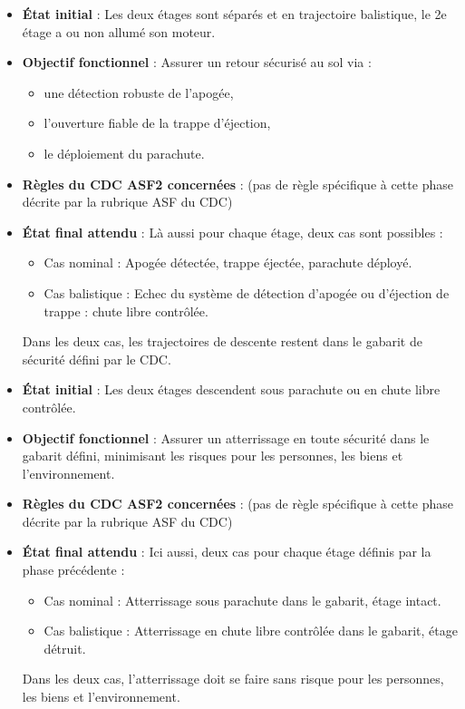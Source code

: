 \begin{itemize}
    \item \textbf{État initial} : Les deux étages sont séparés et en trajectoire balistique, le 2e étage a ou non allumé son moteur.
    \item \textbf{Objectif fonctionnel} : Assurer un retour sécurisé au sol via :
    \begin{itemize}
        \item une détection robuste de l’apogée,
        \item l’ouverture fiable de la trappe d’éjection,
        \item le déploiement du parachute.
    \end{itemize}
    \item \textbf{Règles du \acrshort{CDC} ASF2 concernées} : (pas de règle spécifique à cette phase décrite par la rubrique ASF
    du \acrshort{CDC})
    \item \textbf{État final attendu} : Là aussi pour chaque étage, deux cas sont possibles :
    \begin{itemize}
        \item Cas nominal : Apogée détectée, trappe éjectée, parachute déployé.
        \item Cas balistique : Echec du système de détection d’apogée ou d’éjection de trappe : chute libre contrôlée.
    \end{itemize}
    Dans les deux cas, les trajectoires de descente restent dans le gabarit de sécurité défini par le \acrshort{CDC}.
\end{itemize}

\vfill

\begin{itemize}
    \item \textbf{État initial} : Les deux étages descendent sous parachute ou en chute libre contrôlée.
    \item \textbf{Objectif fonctionnel} : Assurer un atterrissage en toute sécurité dans le gabarit défini, minimisant les
    risques pour les personnes, les biens et l’environnement.
    \item \textbf{Règles du \acrshort{CDC} ASF2 concernées} : (pas de règle spécifique à cette phase décrite par la rubrique ASF
    du \acrshort{CDC})
    \item \textbf{État final attendu} : Ici aussi, deux cas pour chaque étage définis par la phase précédente :
    \begin{itemize}
        \item Cas nominal : Atterrissage sous parachute dans le gabarit, étage intact.
        \item Cas balistique : Atterrissage en chute libre contrôlée dans le gabarit, étage détruit.
    \end{itemize}
    Dans les deux cas, l’atterrissage doit se faire sans risque pour les personnes, les biens et l’environnement.
\end{itemize}

